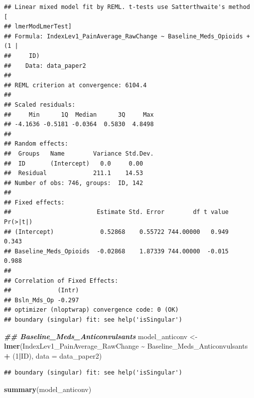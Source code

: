 \documentclass[
  12pt,
]{article}
\newenvironment{Shaded}{\begin{snugshade}}{\end{snugshade}}
\newcommand{\AttributeTok}[1]{\textcolor[rgb]{0.13,0.29,0.53}{#1}}
\newcommand{\DecValTok}[1]{\textcolor[rgb]{0.00,0.00,0.81}{#1}}
\newcommand{\DocumentationTok}[1]{\textcolor[rgb]{0.56,0.35,0.01}{\textbf{\textit{#1}}}}
\newcommand{\FunctionTok}[1]{\textcolor[rgb]{0.13,0.29,0.53}{\textbf{#1}}}
\newcommand{\NormalTok}[1]{#1}
\newcommand{\OtherTok}[1]{\textcolor[rgb]{0.56,0.35,0.01}{#1}}
\newcommand{\SpecialCharTok}[1]{\textcolor[rgb]{0.81,0.36,0.00}{\textbf{#1}}}
\begin{document}
\begin{verbatim}
## Linear mixed model fit by REML. t-tests use Satterthwaite's method [
## lmerModLmerTest]
## Formula: IndexLev1_PainAverage_RawChange ~ Baseline_Meds_Opioids + (1 |  
##     ID)
##    Data: data_paper2
## 
## REML criterion at convergence: 6104.4
## 
## Scaled residuals: 
##     Min      1Q  Median      3Q     Max 
## -4.1636 -0.5181 -0.0364  0.5830  4.8498 
## 
## Random effects:
##  Groups   Name        Variance Std.Dev.
##  ID       (Intercept)   0.0     0.00   
##  Residual             211.1    14.53   
## Number of obs: 746, groups:  ID, 142
## 
## Fixed effects:
##                        Estimate Std. Error        df t value Pr(>|t|)
## (Intercept)             0.52868    0.55722 744.00000   0.949    0.343
## Baseline_Meds_Opioids  -0.02868    1.87339 744.00000  -0.015    0.988
## 
## Correlation of Fixed Effects:
##             (Intr)
## Bsln_Mds_Op -0.297
## optimizer (nloptwrap) convergence code: 0 (OK)
## boundary (singular) fit: see help('isSingular')
\end{verbatim}

\begin{Shaded}
\begin{Highlighting}[]
\DocumentationTok{\#\# Baseline\_Meds\_Anticonvulsants}
\NormalTok{model\_anticonv }\OtherTok{\textless{}{-}} \FunctionTok{lmer}\NormalTok{(IndexLev1\_PainAverage\_RawChange }\SpecialCharTok{\textasciitilde{}}\NormalTok{ Baseline\_Meds\_Anticonvulsants }\SpecialCharTok{+}\NormalTok{ (}\DecValTok{1}\SpecialCharTok{|}\NormalTok{ID), }\AttributeTok{data =}\NormalTok{ data\_paper2)}
\end{Highlighting}
\end{Shaded}

\begin{verbatim}
## boundary (singular) fit: see help('isSingular')
\end{verbatim}

\begin{Shaded}
\begin{Highlighting}[]
\FunctionTok{summary}\NormalTok{(model\_anticonv)}
\end{Highlighting}
\end{Shaded}
\end{document}
